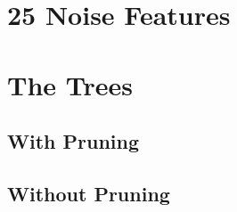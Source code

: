 \documentclass[10pt]{article}
\begin{document}





\section{25 Noise Features}




\section{The Trees}

\subsection{With Pruning}



\subsection{Without Pruning}

\end{document}
